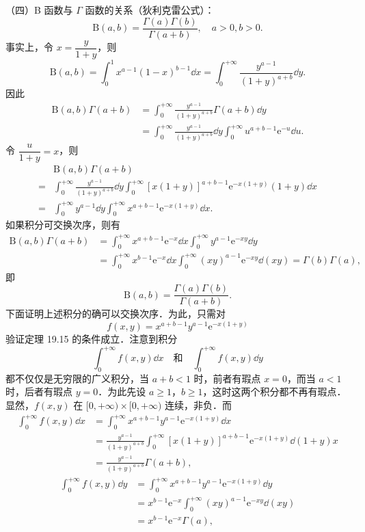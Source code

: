 （四）B 函数与 $\Gamma$ 函数的关系（狄利克雷公式）：
\[
\mathrm{B}(a,b)=\frac{\Gamma(a)\Gamma(b)}{\Gamma(a+b)},\quad a>0,b>0.
\]
事实上，令 $x=\dfrac{y}{1+y}$，则
\[
\mathrm{B}(a,b)=\int_{0}^{1}x^{a-1}(1-x)^{b-1}\dd x=\int_{0}^{+\infty}\frac{y^{a-1}}{(1+y)^{a+b}}\dd y.
\]
因此
\[
\begin{aligned}
\mathrm{B}(a,b)\Gamma(a+b)&=\int_{0}^{+\infty}\frac{y^{a-1}}{(1+y)^{a+b}}\Gamma(a+b)\dd y\\
&=\int_{0}^{+\infty}\frac{y^{a-1}}{(1+y)^{a+b}}\dd y\int_{0}^{+\infty}u^{a+b-1}\mathrm{e}^{-u}\dd u.
\end{aligned}
\]
令 $\dfrac{u}{1+y}=x$，则
\[
\begin{aligned}
&\mathrm{B}(a,b)\Gamma(a+b)\\
={}&\int_{0}^{+\infty}\frac{y^{a-1}}{(1+y)^{a+b}}\dd y\int_{0}^{+\infty}\left[x(1+y)\right]^{a+b-1}\mathrm{e}^{-x(1+y)}(1+y)\dd x\\
={}&\int_{0}^{+\infty}y^{a-1}\dd y\int_{0}^{+\infty}x^{a+b-1}\mathrm{e}^{-x(1+y)}\dd x.
\end{aligned}
\]
如果积分可交换次序，则有
\[
\begin{aligned}
\mathrm{B}(a,b)\Gamma(a+b)&=\int_{0}^{+\infty}x^{a+b-1}\mathrm{e}^{-x}\dd x\int_{0}^{+\infty}y^{a-1}\mathrm{e}^{-xy}\dd y\\
&=\int_{0}^{+\infty}x^{b-1}\mathrm{e}^{-x}\dd x\int_{0}^{+\infty}(xy)^{a-1}\mathrm{e}^{-xy}\dd(xy)=\Gamma(b)\Gamma(a),
\end{aligned}
\]
即
\[
\mathrm{B}(a,b)=\frac{\Gamma(a)\Gamma(b)}{\Gamma(a+b)}.
\]
下面证明上述积分的确可以交换次序．为此，只需对
\[
f(x,y)=x^{a+b-1}y^{a-1}\mathrm{e}^{-x(1+y)}
\]
验证定理 19.15 的条件成立．注意到积分
\[
\int_{0}^{+\infty}f(x,y)\dd x\quad\text{和}\quad\int_{0}^{+\infty}f(x,y)\dd y
\]
都不仅仅是无穷限的广义积分，当 $a+b<1$ 时，前者有瑕点 $x=0$，而当 $a<1$ 时，后者有瑕点 $y=0$．为此先设 $a\geqslant 1$，$b\geqslant 1$，这时这两个积分都不再有瑕点．显然，$f(x,y)$ 在 $[0,+\infty)\times[0,+\infty)$ 连续，非负．而
\[
\begin{aligned}
\int_{0}^{+\infty}f(x,y)\dd x&=\int_{0}^{+\infty}x^{a+b-1}y^{a-1}\mathrm{e}^{-x(1+y)}\dd x\\
&=\frac{y^{a-1}}{(1+y)^{a+b}}\int_{0}^{+\infty}\left[x(1+y)\right]^{a+b-1}\mathrm{e}^{-x(1+y)}\dd(1+y)x\\
&=\frac{y^{a-1}}{(1+y)^{a+b}}\Gamma(a+b),
\end{aligned}
\]
\[
\begin{aligned}
\int_{0}^{+\infty}f(x,y)\dd y&=\int_{0}^{+\infty}x^{a+b-1}y^{a-1}\mathrm{e}^{-x(1+y)}\dd y\\
&=x^{b-1}\mathrm{e}^{-x}\int_{0}^{+\infty}(xy)^{a-1}\mathrm{e}^{-xy}\dd(xy)\\
&=x^{b-1}\mathrm{e}^{-x}\Gamma(a),
\end{aligned}
\]
